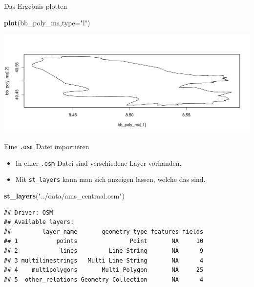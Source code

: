\documentclass[ignorenonframetext,]{beamer}
\newenvironment{Shaded}{\begin{snugshade}}{\end{snugshade}}
\newcommand{\DataTypeTok}[1]{\textcolor[rgb]{0.13,0.29,0.53}{#1}}
\newcommand{\KeywordTok}[1]{\textcolor[rgb]{0.13,0.29,0.53}{\textbf{#1}}}
\newcommand{\NormalTok}[1]{#1}
\newcommand{\StringTok}[1]{\textcolor[rgb]{0.31,0.60,0.02}{#1}}
\providecommand{\tightlist}{%
  \setlength{\itemsep}{0pt}\setlength{\parskip}{0pt}}
\begin{document}
\begin{frame}[fragile]{Das Ergebnis plotten}
\protect\hypertarget{das-ergebnis-plotten}{}

\begin{Shaded}
\begin{Highlighting}[]
\KeywordTok{plot}\NormalTok{(bb_poly_ma,}\DataTypeTok{type=}\StringTok{"l"}\NormalTok{)}
\end{Highlighting}
\end{Shaded}

\includegraphics{B7_simplefeatures_files/figure-beamer/unnamed-chunk-16-1.pdf}

\end{frame}

\begin{frame}[fragile]{Eine \texttt{.osm} Datei importieren}
\protect\hypertarget{eine-.osm-datei-importieren}{}

\begin{itemize}
\tightlist
\item
  In einer \texttt{.osm} Datei sind verschiedene Layer vorhanden.
\item
  Mit \texttt{st\_layers} kann man sich anzeigen lassen, welche das
  sind.
\end{itemize}

\begin{Shaded}
\begin{Highlighting}[]
\KeywordTok{st_layers}\NormalTok{(}\StringTok{"../data/ams_centraal.osm"}\NormalTok{)}
\end{Highlighting}
\end{Shaded}

\begin{verbatim}
## Driver: OSM 
## Available layers:
##         layer_name       geometry_type features fields
## 1           points               Point       NA     10
## 2            lines         Line String       NA      9
## 3 multilinestrings   Multi Line String       NA      4
## 4    multipolygons       Multi Polygon       NA     25
## 5  other_relations Geometry Collection       NA      4
\end{verbatim}

\end{frame}
\end{document}
